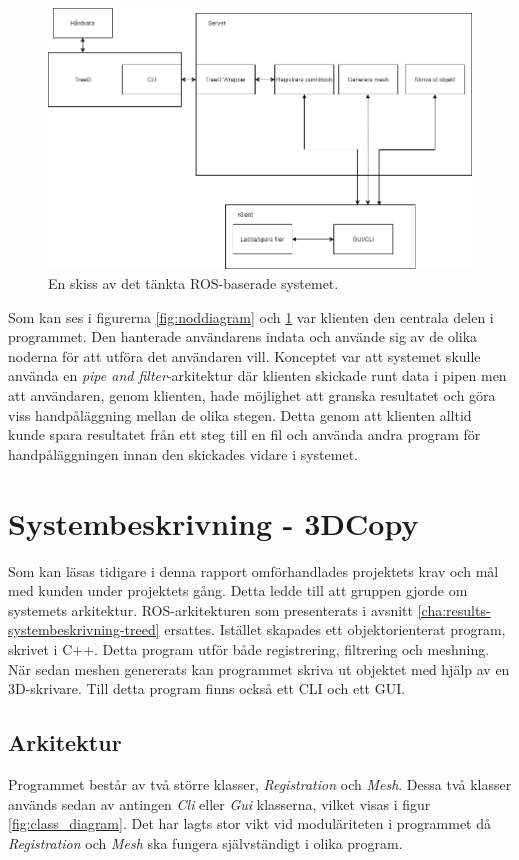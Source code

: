 \begin{figure}[H]
	\centering
	\includegraphics[width=130mm]{figures/Systemskiss_gamla.png}
	\caption{En skiss av det tänkta ROS-baserade systemet.}
	\label{fig:systembeskrivning_gamla}
\end{figure}

Som kan ses i figurerna \ref{fig:noddiagram} och \ref{fig:systembeskrivning_gamla} var klienten den centrala delen i programmet. Den hanterade användarens indata och använde sig av de olika noderna för att utföra det användaren vill. Konceptet var att systemet skulle använda en \textit{pipe and filter}-arkitektur där klienten skickade runt data i pipen men att användaren, genom klienten, hade möjlighet att granska resultatet och göra viss handpåläggning mellan de olika stegen. Detta genom att klienten alltid kunde spara resultatet från ett steg till en fil och använda andra program för handpåläggningen innan den skickades vidare i systemet.

\section{Systembeskrivning - 3DCopy}

Som kan läsas tidigare i denna rapport omförhandlades projektets krav och mål med kunden under projektets gång. Detta ledde till att gruppen gjorde om systemets arkitektur. ROS-arkitekturen som presenterats i avsnitt \ref{cha:results-systembeskrivning-treed} ersattes. Istället skapades ett objektorienterat program, skrivet i C++. Detta program utför både registrering, filtrering och meshning. När sedan meshen genererats kan programmet skriva ut objektet med hjälp av en 3D-skrivare. Till detta program finns också ett CLI och ett GUI.

\subsection{Arkitektur}
Programmet består av två större klasser, \textit{Registration} och \textit{Mesh}. Dessa två klasser används sedan av antingen \textit{Cli}  eller \textit{Gui} klasserna, vilket visas i figur \ref{fig:class_diagram}.  Det har lagts stor vikt vid moduläriteten i programmet då \textit{Registration} och \textit{Mesh} ska fungera självständigt i olika program.

